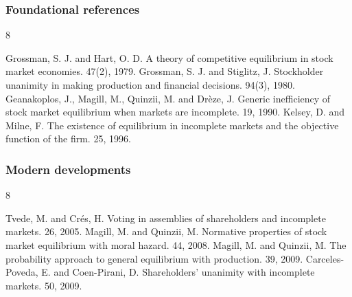 \documentclass[blue]{beamer}
\theoremstyle{definition}
\theoremstyle{example}
\begin{document}
\begin{frame}\frametitle{Foundational references}
\begin{thebibliography}{8}
\begin{small}
  \beamertemplatearticlebibitems
    Grossman, S. J. and Hart, O. D.
    \newblock A theory of competitive equilibrium in stock market economies.
     47(2), 1979.
    Grossman, S. J. and Stiglitz, J.
    \newblock Stockholder unanimity in making production and financial decisions.
     94(3), 1980.
    Geanakoplos, J., Magill, M., Quinzii, M. and Dr\`eze, J.
    \newblock Generic inefficiency of stock market equilibrium when markets are incomplete.
     19, 1990.
    Kelsey, D. and Milne, F.
    \newblock The existence of equilibrium in incomplete markets and the objective function of the firm.
     25, 1996.
\end{small}
\end{thebibliography}
\end{frame}

\begin{frame}\frametitle{Modern developments}
\begin{thebibliography}{8}
\begin{small}
  \beamertemplatearticlebibitems
    Tvede, M. and Cr\'es, H.
    \newblock Voting in assemblies of shareholders and incomplete markets.
     26, 2005.
    Magill, M. and Quinzii, M.
    \newblock Normative properties of stock market equilibrium with moral hazard.
     44, 2008.
    Magill, M. and Quinzii, M.
    \newblock The probability approach to general equilibrium with production.
     39, 2009.
    Carceles-Poveda, E. and Coen-Pirani, D.
    \newblock Shareholders' unanimity with incomplete markets.
     50, 2009.
\end{small}
\end{thebibliography}
\end{frame}
\end{document}
